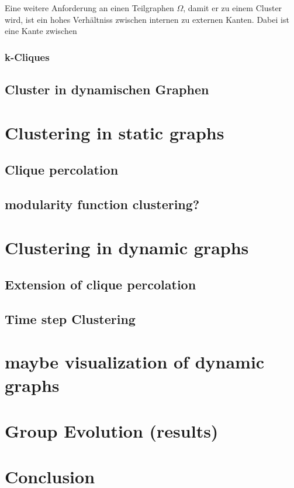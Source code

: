 \documentclass[journal]{vgtc}
\begin{document}
  Eine weitere Anforderung an einen Teilgraphen $\Omega$, damit er zu einem Cluster
  wird, ist ein hohes Verhältniss zwischen internen zu externen Kanten. Dabei
  ist eine Kante zwischen
  
  
  
  \subsubsection{k-Cliques}
  
  \subsection{Cluster in dynamischen Graphen}
  
\section{Clustering in static graphs}
  \subsection{Clique percolation}
  \subsection{modularity function clustering?}

\section{Clustering in dynamic graphs}
  \subsection{Extension of clique percolation}
  \subsection{Time step Clustering}

\section{maybe visualization of dynamic graphs}
  
\section{Group Evolution (results)}
 
\section{Conclusion}
\end{document}
